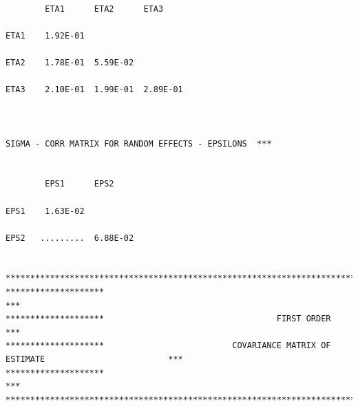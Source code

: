 \documentclass[
  10pt,
]{krantz}
\begin{document}
\begin{verbatim}
                                                                                                       
        ETA1      ETA2      ETA3                                                                       
                                                                                                       
ETA1    1.92E-01                                                                                       
                                                                                                       
ETA2    1.78E-01  5.59E-02                                                                             
                                                                                                       
ETA3    2.10E-01  1.99E-01  2.89E-01                                                                   
                                                                                                       
                                                                                                       
                                                                                                       
SIGMA - CORR MATRIX FOR RANDOM EFFECTS - EPSILONS  ***                                                 
                                                                                                       
                                                                                                       
        EPS1      EPS2                                                                                 
                                                                                                       
EPS1    1.63E-02                                                                                       
                                                                                                       
EPS2   .........  6.88E-02                                                                             
                                                                                                       
                                                                                                       
*******************************************************************************************************
********************                                                                                ***
********************                                   FIRST ORDER                                  ***
********************                          COVARIANCE MATRIX OF ESTIMATE                         ***
********************                                                                                ***
*******************************************************************************************************
                                                                                                       

\end{verbatim}
\end{document}
